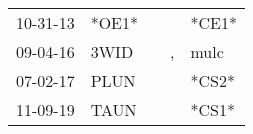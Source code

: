 \begin{supertabular}{p{0.07\textwidth}p{0.06\textwidth}p{0.02\textwidth}p{0.02\textwidth}p{0.06\textwidth}}
 10-31-13\textsuperscript{} &                   *OE1* &   &    &                   *CE1* \\
 09-04-16\textsuperscript{} &  3WID\textsuperscript{} &   &  , &  mulc\textsuperscript{} \\
 07-02-17\textsuperscript{} &  PLUN\textsuperscript{} &   &    &                   *CS2* \\
 11-09-19\textsuperscript{} &  TAUN\textsuperscript{} &   &    &                   *CS1* \\
\end{supertabular}
